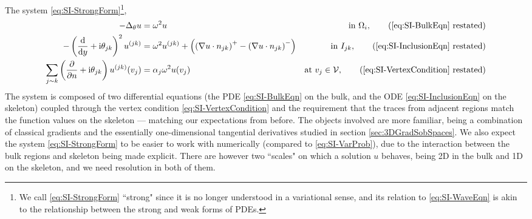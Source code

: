 The system \eqref{eq:SI-StrongForm}\footnote{We call \eqref{eq:SI-StrongForm} ``strong" since it is no longer understood in a variational sense, and its relation to \eqref{eq:SI-WaveEqn} is akin to the relationship between the strong and weak forms of PDEs.}, 
\begin{subequations}
	\begin{align*}
		-\laplacian_\qm u 
		&= \omega^2 u 
		&\text{in } \ddom_i, \tag{\eqref{eq:SI-BulkEqn} restated} \\
		- \bracs{\diff{}{y} + \rmi\qm_{jk}}^2u^{(jk)}  
		&= \omega^2 u^{(jk)} + \bracs{\bracs{\grad u\cdot n_{jk}}^+ - \bracs{\grad u\cdot n_{jk}}^-}
		&\text{in } I_{jk}, \tag{\eqref{eq:SI-InclusionEqn} restated} \\
		\sum_{j\con k} \bracs{\pdiff{}{n}+\rmi\qm_{jk}} u^{(jk)}(v_j) 
		&= \alpha_j\omega^2 u(v_j)
		&\text{at } v_j\in\vertSet, \tag{\eqref{eq:SI-VertexCondition} restated}
	\end{align*}
\end{subequations}
The system is composed of two differential equations (the PDE \eqref{eq:SI-BulkEqn} on the bulk, and the ODE \eqref{eq:SI-InclusionEqn} on the skeleton) coupled through the vertex condition \eqref{eq:SI-VertexCondition} and the requirement that the traces from adjacent regions match the function values on the skeleton --- matching our expectations from before.
The objects involved are more familiar, being a combination of classical gradients and the essentially one-dimensional tangential derivatives studied in section \ref{sec:3DGradSobSpaces}.
We also expect the system \eqref{eq:SI-StrongForm} to be easier to work with numerically (compared to \eqref{eq:SI-VarProb}), due to the interaction between the bulk regions and skeleton being made explicit.
There are however two ``scales" on which a solution $u$ behaves, being 2D in the bulk and 1D on the skeleton, and we need resolution in both of them.
%
